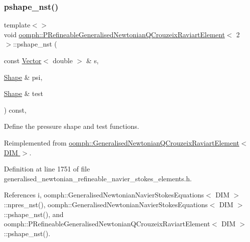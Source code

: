 \subsubsection{\texorpdfstring{pshape\+\_\+nst()}{pshape\_nst()}\hspace{0.1cm}{\footnotesize\ttfamily [4/6]}}
{\footnotesize\ttfamily template$<$$>$ \\
void \hyperlink{classoomph_1_1PRefineableGeneralisedNewtonianQCrouzeixRaviartElement}{oomph\+::\+P\+Refineable\+Generalised\+Newtonian\+Q\+Crouzeix\+Raviart\+Element}$<$ 2 $>$\+::pshape\+\_\+nst (\begin{DoxyParamCaption}\item[{const \hyperlink{classoomph_1_1Vector}{Vector}$<$ double $>$ \&}]{s,  }\item[{\hyperlink{classoomph_1_1Shape}{Shape} \&}]{psi,  }\item[{\hyperlink{classoomph_1_1Shape}{Shape} \&}]{test }\end{DoxyParamCaption}) const\hspace{0.3cm}{\ttfamily [inline]}, {\ttfamily [virtual]}}



Define the pressure shape and test functions. 



Reimplemented from \hyperlink{classoomph_1_1GeneralisedNewtonianQCrouzeixRaviartElement_aaf51b44d72cceba2115671c6d99cb38c}{oomph\+::\+Generalised\+Newtonian\+Q\+Crouzeix\+Raviart\+Element$<$ D\+I\+M $>$}.



Definition at line 1751 of file generalised\+\_\+newtonian\+\_\+refineable\+\_\+navier\+\_\+stokes\+\_\+elements.\+h.



References i, oomph\+::\+Generalised\+Newtonian\+Navier\+Stokes\+Equations$<$ D\+I\+M $>$\+::npres\+\_\+nst(), oomph\+::\+Generalised\+Newtonian\+Navier\+Stokes\+Equations$<$ D\+I\+M $>$\+::pshape\+\_\+nst(), and oomph\+::\+P\+Refineable\+Generalised\+Newtonian\+Q\+Crouzeix\+Raviart\+Element$<$ D\+I\+M $>$\+::pshape\+\_\+nst().

\mbox{\label{classoomph_1_1PRefineableGeneralisedNewtonianQCrouzeixRaviartElement_a80e3fffb08dc9228fae0535d15cbc096}} 
